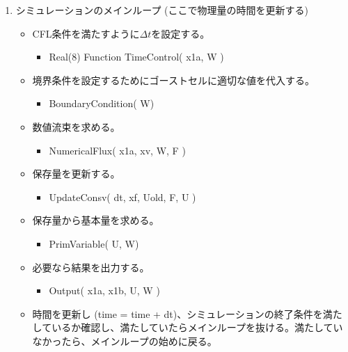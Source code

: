 {\begin{enumerate}
     \item シミュレーションのメインループ (ここで物理量の時間を更新する)
     \begin{itemize}
         \item CFL条件を満たすように$\Delta t$を設定する。 
         \begin{itemize}
             \item  {\ttfamily Real(8) Function 
             TimeControl( {\color{blue}x1a, W} )}
         \end{itemize}
         \item 境界条件を設定するためにゴーストセルに適切な値を代入する。
         \begin{itemize}
             \item  {\ttfamily BoundaryCondition({\color{red} W})}
           \end{itemize}
           \item 数値流束を求める。 
           \begin{itemize}
               \item  {\ttfamily NumericalFlux( {\color{blue} x1a, xv, W}, {\color{red} F} )}
           \end{itemize}
          \item 保存量を更新する。 
          \begin{itemize}
              \item  {\ttfamily UpdateConsv( {\color{blue} dt, xf, Uold, F}, {\color{red} U} )}
          \end{itemize}
            
          
          \item 保存量から基本量を求める。
          \begin{itemize}
              \item  {\ttfamily PrimVariable({\color{blue} U}, {\color{red} W})}
          \end{itemize}
          

          \item 必要なら結果を出力する。
          \begin{itemize}
              \item {\ttfamily Output( {\color{blue} x1a, x1b, U, W} )}
          \end{itemize}
          
          \item 時間を更新し ({\ttfamily time = time + dt})、シミュレーションの終了条件を満たしているか確認し、満たしていたらメインループを抜ける。満たしていなかったら、メインループの始めに戻る。
          

\end{itemize}
\end{enumerate}}
